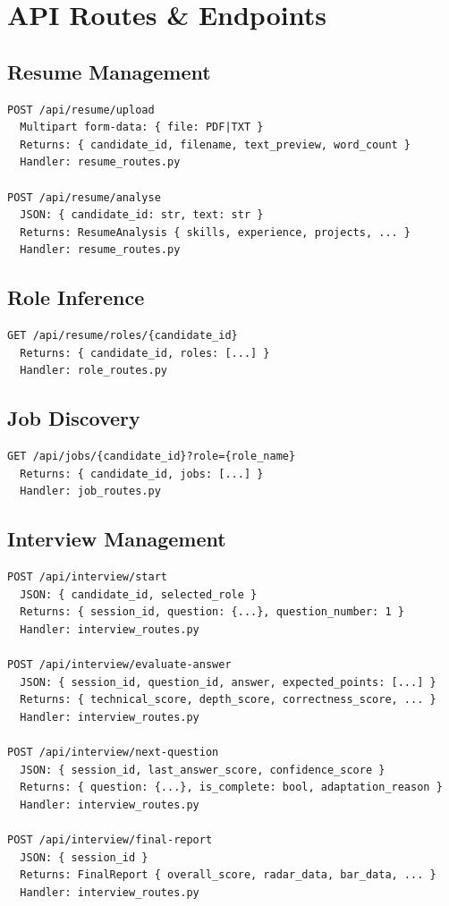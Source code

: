\documentclass[11pt]{article}
\begin{document}
\newpage

\section{API Routes \& Endpoints}

\subsection{Resume Management}

\begin{verbatim}
POST /api/resume/upload
  Multipart form-data: { file: PDF|TXT }
  Returns: { candidate_id, filename, text_preview, word_count }
  Handler: resume_routes.py

POST /api/resume/analyse
  JSON: { candidate_id: str, text: str }
  Returns: ResumeAnalysis { skills, experience, projects, ... }
  Handler: resume_routes.py
\end{verbatim}

\subsection{Role Inference}

\begin{verbatim}
GET /api/resume/roles/{candidate_id}
  Returns: { candidate_id, roles: [...] }
  Handler: role_routes.py
\end{verbatim}

\subsection{Job Discovery}

\begin{verbatim}
GET /api/jobs/{candidate_id}?role={role_name}
  Returns: { candidate_id, jobs: [...] }
  Handler: job_routes.py
\end{verbatim}

\subsection{Interview Management}

\begin{verbatim}
POST /api/interview/start
  JSON: { candidate_id, selected_role }
  Returns: { session_id, question: {...}, question_number: 1 }
  Handler: interview_routes.py

POST /api/interview/evaluate-answer
  JSON: { session_id, question_id, answer, expected_points: [...] }
  Returns: { technical_score, depth_score, correctness_score, ... }
  Handler: interview_routes.py

POST /api/interview/next-question
  JSON: { session_id, last_answer_score, confidence_score }
  Returns: { question: {...}, is_complete: bool, adaptation_reason }
  Handler: interview_routes.py

POST /api/interview/final-report
  JSON: { session_id }
  Returns: FinalReport { overall_score, radar_data, bar_data, ... }
  Handler: interview_routes.py
\end{verbatim}
\end{document}
